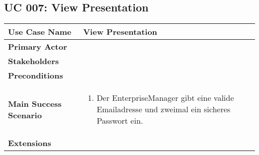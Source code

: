 \subsection{UC 007: View Presentation}
\label{uc:007-view-pres}

\begin{tabular}{|l|p{}|}
\hline
\textbf{Use Case Name} 	&	View Presentation	\\ \hline
\textbf{Primary Actor} 	&		\\ \hline
\textbf{Stakeholders}	&		\\ \hline
\textbf{Preconditions}	&		\\ \hline
\textbf{Main Success Scenario}	&
\begin{enumerate}
	\item Der EnterpriseManager gibt eine valide Emailadresse und zweimal ein sicheres Passwort ein.
\end{enumerate}
\\ \hline
\textbf{Extensions}	& 	\\ \hline
\end{tabular}